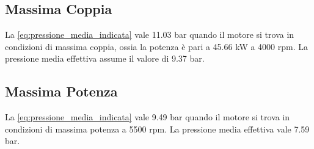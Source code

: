 \documentclass[a4paper,12pt]{article}
\begin{document}
\subsection{Massima Coppia}
La \eqref{eq:pressione_media_indicata} vale 11.03 bar quando il motore si trova in condizioni di massima coppia, ossia la potenza è pari a 45.66 kW a 4000 rpm.
La pressione media effettiva assume il valore di 9.37 bar.
\subsection{Massima Potenza}
La \eqref{eq:pressione_media_indicata} vale 9.49 bar quando il motore si trova in condizioni di massima potenza a 5500 rpm.
La pressione media effettiva vale 7.59 bar.
\end{document}
